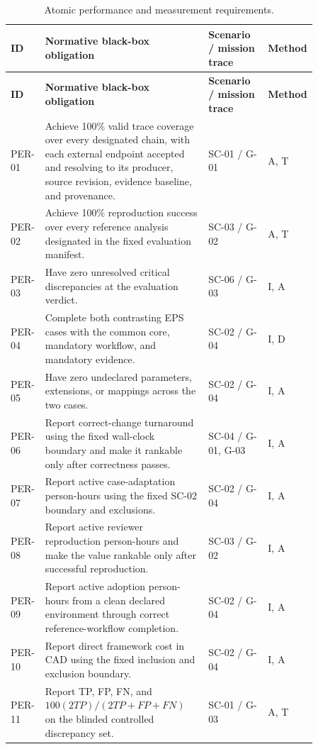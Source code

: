 \documentclass[11pt,a4paper]{article}
\begin{document}
\begin{longtable}{>{\raggedright\arraybackslash}p{0.07\linewidth} >{\raggedright\arraybackslash}p{0.52\linewidth} >{\raggedright\arraybackslash}p{0.19\linewidth} >{\raggedright\arraybackslash}p{0.08\linewidth}}
    \caption{Atomic performance and measurement requirements.}\label{tab:framework-performance-requirements}\\
    \toprule
    \textbf{ID} & \textbf{Normative black-box obligation} & \textbf{Scenario / mission trace} & \textbf{Method} \\
    \midrule
    \endfirsthead
    \toprule
    \textbf{ID} & \textbf{Normative black-box obligation} & \textbf{Scenario / mission trace} & \textbf{Method} \\
    \midrule
    \endhead
    PER-01 & Achieve 100\% valid trace coverage over every designated chain, with each external endpoint accepted and resolving to its producer, source revision, evidence baseline, and provenance. & SC-01 / G-01 & A, T \\
    PER-02 & Achieve 100\% reproduction success over every reference analysis designated in the fixed evaluation manifest. & SC-03 / G-02 & A, T \\
    PER-03 & Have zero unresolved critical discrepancies at the evaluation verdict. & SC-06 / G-03 & I, A \\
    PER-04 & Complete both contrasting EPS cases with the common core, mandatory workflow, and mandatory evidence. & SC-02 / G-04 & I, D \\
    PER-05 & Have zero undeclared parameters, extensions, or mappings across the two cases. & SC-02 / G-04 & I, A \\
    PER-06 & Report correct-change turnaround using the fixed wall-clock boundary and make it rankable only after correctness passes. & SC-04 / G-01, G-03 & I, A \\
    PER-07 & Report active case-adaptation person-hours using the fixed SC-02 boundary and exclusions. & SC-02 / G-04 & I, A \\
    PER-08 & Report active reviewer reproduction person-hours and make the value rankable only after successful reproduction. & SC-03 / G-02 & I, A \\
    PER-09 & Report active adoption person-hours from a clean declared environment through correct reference-workflow completion. & SC-02 / G-04 & I, A \\
    PER-10 & Report direct framework cost in CAD using the fixed inclusion and exclusion boundary. & SC-02 / G-04 & I, A \\
    PER-11 & Report TP, FP, FN, and $100(2TP)/(2TP+FP+FN)$ on the blinded controlled discrepancy set. & SC-01 / G-03 & A, T \\
    \bottomrule
\end{longtable}
\end{document}

